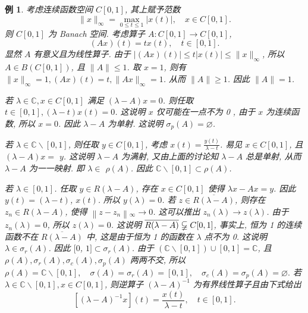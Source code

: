 \documentclass[openany]{ctexbook}
\theoremstyle{kaiti}
\theoremstyle{normal}
\newtheorem{example}{例}[section]
\begin{document}
\begin{example}
考虑连续函数空间 $C[0,1]$, 其上赋予范数
$$
\|x\|_{\infty}=\max_{0 \leqslant t \leqslant 1}|x(t)|, \quad x \in C[0,1].
$$
则 $C[0,1]$ 为 Banach 空间. 考虑算子 $A: C[0,1] \rightarrow C[0,1]$,
$$
(A x)(t)=t x(t), \quad t \in[0,1].
$$
显然 $A$ 有意义且为线性算子. 由于
$|(A x)(t)| \leqslant t|x(t)| \leqslant\|x\|_{\infty}$,
所以 $A \in B(C[0,1])$, 且 $\|A\| \leqslant 1$. 取 $x=1$, 则有 $\|x\|_{\infty}=1,(A x)(t)=t,\|A x\|_{\infty}=1$. 从而 $\|A\| \geqslant 1$. 因此 $\|A\|=1$.

若 $\lambda \in \mathbb{C}, x \in C[0,1]$ 满足 $(\lambda-A) x=0$. 则任取 $t \in[0,1],(\lambda-t) x(t)=0$. 这说明 $x$ 仅可能在一点不为 0 , 由于 $x$ 为连续函数, 所以 $x=0$. 因此 $\lambda-A$ 为单射. 这说明 $\sigma_{p}(A)=\varnothing$.

若 $\lambda \in \mathbb{C} \backslash[0,1]$, 则任取 $y \in C[0,1]$, 考虑 $x(t)=\frac{y(t)}{\lambda-t}$. 易见 $x \in C[0,1]$, 且 $(\lambda-A) x=$ $y$. 这说明 $\lambda-A$ 为满射, 又由上面的讨论知 $\lambda-A$ 总是单射, 从而 $\lambda-A$ 为一一映射. 即 $\lambda \in$ $\rho(A)$. 因此 $\mathbb{C} \backslash[0,1] \subset \rho(A)$.

若 $\lambda \in[0,1]$. 任取 $y \in R(\lambda-A)$, 存在 $x \in C[0,1]$ 使得 $\lambda x-A x=y$. 因此 $y(t)=(\lambda-t)$, $x(t)$. 所以 $y(\lambda)=0$. 若 $z \in \overline{R(\lambda-A)}$, 则存在 $z_n \in R(\lambda-A)$, 使得 $\left\|z-z_n\right\|{ }_{\infty} \rightarrow 0$. 这可以推出 $z_n(\lambda) \rightarrow z(\lambda)$. 由于 $z_n(\lambda)=0$, 所以 $z(\lambda)=0$. 这说明 $\overline{R(\lambda-A)} \varsubsetneqq C[0,1]$, 事实上, 恒为 1 的连续函数不在 $\overline{R(\lambda-A)}$ 中, 这是由于恒为 1 的函数在 $\lambda$ 点不为 0. 这说明 $\lambda \in \sigma_{r}(A)$. 因此 $[0$, $1] \subset \sigma_{r}(A)$. 由于 $(\mathbb{C} \backslash[0,1]) \cup[0,1]=\mathbb{C}$, 且 $\rho(A), \sigma_{r}(A), \sigma_{c}(A), \sigma_{p}(A)$ 两两不交, 所以 $\rho(A)=\mathbb{C} \backslash[0,1], \quad \sigma(A)=\sigma_{r}(A)=[0,1], \quad \sigma_{c}(A)=\sigma_{p}(A)=\varnothing.$ 若 $\lambda \in \mathbb{C} \backslash[0,1], x \in C[0,1]$, 则逆算子 $(\lambda-A)^{-1}$ 为有界线性算子且由下式给出
$$
\left[(\lambda-A)^{-1} x\right](t)=\frac{x(t)}{\lambda-t}, \quad t \in[0,1].
$$
\end{example}
\end{document}
